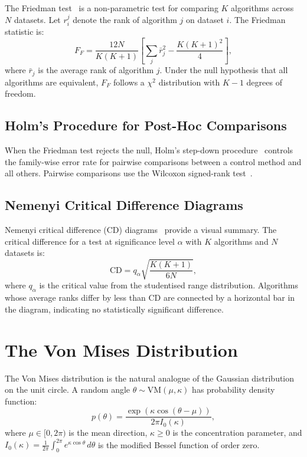 The Friedman test~\cite{friedman1937use} is a non-parametric test for comparing $K$ algorithms across $N$ datasets.
Let $r_i^j$ denote the rank of algorithm $j$ on dataset $i$.
The Friedman statistic is:
\begin{equation}
  F_F = \frac{12N}{K(K+1)} \left[ \sum_j \bar{r}_j^2 - \frac{K(K+1)^2}{4} \right],
  \label{eq:friedman}
\end{equation}
where $\bar{r}_j$ is the average rank of algorithm $j$.
Under the null hypothesis that all algorithms are equivalent, $F_F$ follows a $\chi^2$ distribution with $K-1$ degrees of freedom.

\subsection{Holm's Procedure for Post-Hoc Comparisons}

When the Friedman test rejects the null, Holm's step-down procedure~\cite{holm1979simple} controls the family-wise error rate for pairwise comparisons between a control method and all others.
Pairwise comparisons use the Wilcoxon signed-rank test~\cite{wilcoxon1945individual}.

\subsection{Nemenyi Critical Difference Diagrams}

Nemenyi critical difference (CD) diagrams~\cite{demsar2006statistical} provide a visual summary.
The critical difference for a test at significance level $\alpha$ with $K$ algorithms and $N$ datasets is:
\begin{equation}
  \mathrm{CD} = q_\alpha \sqrt{\frac{K(K+1)}{6N}},
  \label{eq:cd}
\end{equation}
where $q_\alpha$ is the critical value from the studentised range distribution.
Algorithms whose average ranks differ by less than CD are connected by a horizontal bar in the diagram, indicating no statistically significant difference.

\section{The Von Mises Distribution}
\label{sec:bg:vonmises}

The Von Mises distribution is the natural analogue of the Gaussian distribution on the unit circle.
A random angle $\theta \sim \mathrm{VM}(\mu, \kappa)$ has probability density function:
\begin{equation}
  p(\theta) = \frac{\exp(\kappa \cos(\theta - \mu))}{2\pi I_0(\kappa)},
  \label{eq:vonmises}
\end{equation}
where $\mu \in [0, 2\pi)$ is the mean direction, $\kappa \geq 0$ is the concentration parameter, and $I_0(\kappa) = \frac{1}{2\pi}\int_0^{2\pi} e^{\kappa\cos\theta}\,d\theta$ is the modified Bessel function of order zero.

